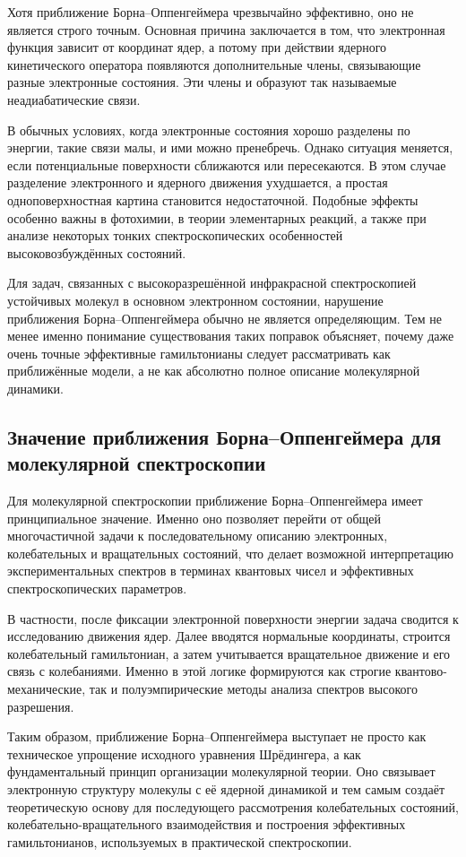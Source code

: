Хотя приближение Борна--Оппенгеймера чрезвычайно эффективно,
оно не является строго точным. Основная причина заключается в том,
что электронная функция зависит от координат ядер, а потому
при действии ядерного кинетического оператора появляются дополнительные
члены, связывающие разные электронные состояния. Эти члены и образуют
так называемые неадиабатические связи.

В обычных условиях, когда электронные состояния хорошо разделены по энергии,
такие связи малы, и ими можно пренебречь. Однако ситуация меняется,
если потенциальные поверхности сближаются или пересекаются.
В этом случае разделение электронного и ядерного движения ухудшается,
а простая одноповерхностная картина становится недостаточной.
Подобные эффекты особенно важны в фотохимии, в теории элементарных
реакций, а также при анализе некоторых тонких спектроскопических
особенностей высоковозбуждённых состояний.

Для задач, связанных с высокоразрешённой инфракрасной спектроскопией
устойчивых молекул в основном электронном состоянии, нарушение
приближения Борна--Оппенгеймера обычно не является определяющим.
Тем не менее именно понимание существования таких поправок
объясняет, почему даже очень точные эффективные гамильтонианы
следует рассматривать как приближённые модели, а не как абсолютно
полное описание молекулярной динамики.

\subsection{Значение приближения Борна--Оппенгеймера для молекулярной спектроскопии}

Для молекулярной спектроскопии приближение Борна--Оппенгеймера
имеет принципиальное значение. Именно оно позволяет перейти
от общей многочастичной задачи к последовательному описанию
электронных, колебательных и вращательных состояний, что делает
возможной интерпретацию экспериментальных спектров в терминах
квантовых чисел и эффективных спектроскопических параметров.

В частности, после фиксации электронной поверхности энергии
задача сводится к исследованию движения ядер. Далее вводятся
нормальные координаты, строится колебательный гамильтониан,
а затем учитывается вращательное движение и его связь с колебаниями.
Именно в этой логике формируются как строгие квантово-механические,
так и полуэмпирические методы анализа спектров высокого разрешения.

Таким образом, приближение Борна--Оппенгеймера выступает не просто
как техническое упрощение исходного уравнения Шрёдингера, а как
фундаментальный принцип организации молекулярной теории.
Оно связывает электронную структуру молекулы с её ядерной динамикой
и тем самым создаёт теоретическую основу для последующего рассмотрения
колебательных состояний, колебательно-вращательного взаимодействия
и построения эффективных гамильтонианов, используемых
в практической спектроскопии.

